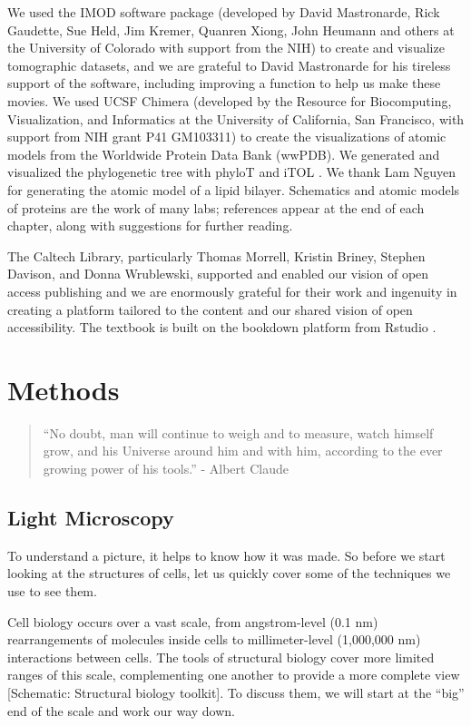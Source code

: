 \documentclass[]{tufte-book}
\begin{document}
We used the IMOD software package (developed by David Mastronarde, Rick Gaudette, Sue Held, Jim Kremer, Quanren Xiong, John Heumann and others at the University of Colorado with support from the NIH) to create and visualize tomographic datasets, and we are grateful to David Mastronarde for his tireless support of the software, including improving a function to help us make these movies. We used UCSF Chimera (developed by the Resource for Biocomputing, Visualization, and Informatics at the University of California, San Francisco, with support from NIH grant P41 GM103311) to create the visualizations of atomic models from the Worldwide Protein Data Bank (wwPDB). We generated and visualized the phylogenetic tree with phyloT and iTOL \citep{letunic2019}. We thank Lam Nguyen for generating the atomic model of a lipid bilayer. Schematics and atomic models of proteins are the work of many labs; references appear at the end of each chapter, along with suggestions for further reading.

The Caltech Library, particularly Thomas Morrell, Kristin Briney, Stephen Davison, and Donna Wrublewski, supported and enabled our vision of open access publishing and we are enormously grateful for their work and ingenuity in creating a platform tailored to the content and our shared vision of open accessibility. The textbook is built on the bookdown platform from Rstudio \citep{xie2016}.

\hypertarget{methods}{%
\chapter{Methods}\label{methods}}

\begin{quote}
``No doubt, man will continue to weigh and to measure, watch himself grow, and his Universe around him and with him, according to the ever growing power of his tools.''
- Albert Claude \citep{claude1974}
\end{quote}

\hypertarget{light-microscopy}{%
\section{Light Microscopy}\label{light-microscopy}}

To understand a picture, it helps to know how it was made. So before we start looking at the structures of cells, let us quickly cover some of the techniques we use to see them.

Cell biology occurs over a vast scale, from angstrom-level (0.1 nm) rearrangements of molecules inside cells to millimeter-level (1,000,000 nm) interactions between cells. The tools of structural biology cover more limited ranges of this scale, complementing one another to provide a more complete view {[}Schematic: Structural biology toolkit{]}. To discuss them, we will start at the ``big'' end of the scale and work our way down.
\end{document}
